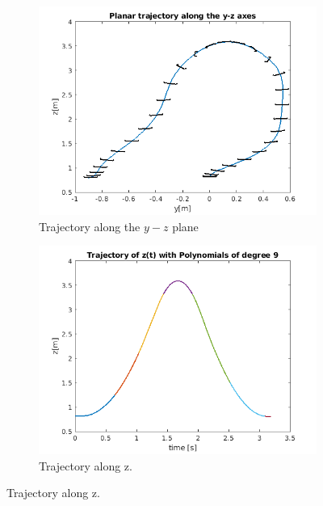 \documentclass{thesisreport}
\begin{document}
\begin{figure}[h]
	\begin{subfigure}{0.45\textwidth}
		\includegraphics[width=\linewidth]{Images/optimization/trajectory.png}
		\caption{Trajectory along the $y-z$ plane} \label{fig:y_z_fmincon}
	\end{subfigure}\hspace*{\fill}
	\begin{subfigure}{0.45\textwidth}
		\includegraphics[width=\linewidth]{Images/optimization/z.png}
		\caption{Trajectory along z.} \label{fig:z_fmincon}
	\end{subfigure}


\end{figure}
\end{document}
